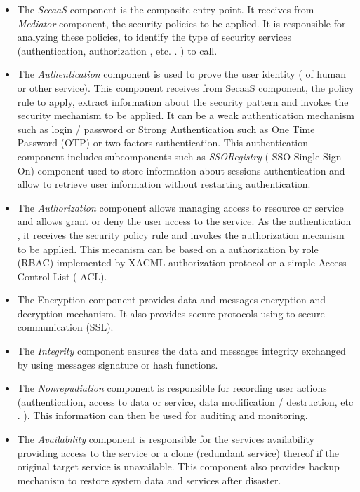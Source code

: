 \documentclass[runningheads,a4paper]{llncs}
\begin{document}
\begin{itemize}
\settowidth{\leftmargin}{{\Large$\square$}}\advance\leftmargin{}
\itemsep8pt\relax
\renewcommand\labelitemi{{\lower1.5pt\hbox{\Large$\square$}}}

\item The \emph{SecaaS} component is the composite entry point. It receives from \emph{Mediator} component, the security policies to be applied. It is responsible for analyzing these policies, to identify the type of security services (authentication, authorization , etc. . ) to call.
\item The \emph{Authentication} component is used to prove the user identity  ( of human or other service). This component receives from SecaaS component, the policy rule to apply, extract information about the security pattern and invokes the security mechanism to be applied. It can be a weak authentication mechanism such as login / password or Strong Authentication such as One Time Password (OTP) or two factors authentication. This authentication component includes subcomponents such as \emph{SSORegistry} ( SSO Single Sign On) component used to store information about sessions authentication  and allow to retrieve user information without restarting authentication.

\item The \emph{Authorization} component allows managing access to resource or service and allows grant or deny the user access to the service. As the authentication , it receives the security policy rule and invokes the authorization mecanism to be applied. This mecanism can be  based on a authorization by role (RBAC) implemented by XACML authorization protocol or a simple Access Control List ( ACL).
\item The Encryption component provides data and messages encryption and decryption mechanism. It also provides secure protocols using  to secure communication (SSL).
\item The \emph{Integrity} component ensures the data and messages integrity exchanged by using messages signature or hash functions.
\item The \emph{Nonrepudiation} component is responsible for recording user actions (authentication, access to data or service, data modification / destruction, etc . ). This information can then be used for auditing and monitoring.
\item The \emph{Availability} component is responsible for the services availability providing access to the service or a clone (redundant service) thereof if the original target service is unavailable. This component also provides backup mechanism to restore system data and services after disaster.


\end{itemize}
\end{document}
